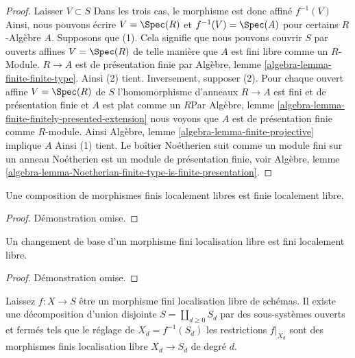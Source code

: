 \begin{proof}

Laisser $V \subset S$ Dans les trois cas, le morphisme est donc affiné $f^{-1}(V)$ Ainsi, nous pouvons écrire $V = \Spec(R)$ et $f^{-1}(V) = \Spec(A)$
pour certains $R$-Algèbre $A$. Supposons que (1). Cela signifie que nous pouvons couvrir $S$ par ouverts affines
$V = \Spec(R)$ de telle manière que $A$ est fini libre comme un $R$- Module. $R \to A$ est de présentation finie par Algèbre, lemme \ref{algebra-lemma-finite-finite-type}. Ainsi (2) tient. Inversement, supposer (2). Pour chaque ouvert affine $V = \Spec(R)$ de $S$ l'homomorphisme d'anneaux
$R \to A$ est fini et de présentation finie et $A$ est plat comme un $R$Par Algèbre, lemme \ref{algebra-lemma-finite-finitely-presented-extension}
nous voyons que $A$ est de présentation finie comme $R$-module. Ainsi Algèbre, lemme \ref{algebra-lemma-finite-projective}
implique $A$ Ainsi (1) tient. Le boîtier Noétherien suit comme un module fini sur un anneau Noétherien est un module de présentation finie, voir Algèbre, lemme \ref{algebra-lemma-Noetherian-finite-type-is-finite-presentation}.

\end{proof}

\begin{lemma}

\label{lemma-composition-finite-locally-free}
Une composition de morphismes finis localement libres est finie localement libre.
\end{lemma}

\begin{proof}
Démonstration omise.
\end{proof}

\begin{lemma}

\label{lemma-base-change-finite-locally-free}
Un changement de base d'un morphisme fini localisation libre est fini localement libre.
\end{lemma}

\begin{proof}
Démonstration omise.
\end{proof}

\begin{lemma}

\label{lemma-finite-locally-free}
Laissez $f : X \to S$ être un morphisme fini localisation libre de schémas. Il existe une décomposition d'union disjointe $S = \coprod_{d \geq 0} S_d$ par des sous-systèmes ouverts et fermés tels que le réglage de $X_d = f^{-1}(S_d)$ les restrictions $f|_{X_d}$ sont des morphismes finis localisation libre $X_d \to S_d$ de degré $d$.
\end{lemma}

